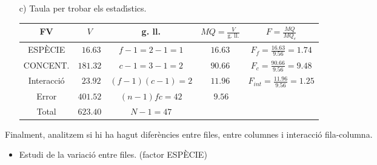 {\begin{itemize}
\begin{eqnarray*}
	\frac{{\left(\sum\limits_{r=1}^f\sum\limits_{s=1}^c\sum\limits_{i=1}^n 
	Y_{irs}\right)}^2}{nfc} = 5063.153 - 4441.74 \\ & = & 623.4065, \\
	V_e & = & \sum_{r=1}^f\sum_{s=1}^c\sum_{i=1}^n Y_{irs}^2 -
	 \frac{\sum\limits_{r=1}^f\sum\limits_{s=1}^c{\left(\sum\limits_{i=1}^n 
	Y_{irs}\right)}^2}{n} = 5065.153 - 4663.6317 \\ & = & 401.5213, \\
	V_f & = & \frac{\sum\limits_{r=1}^f {\left(\sum\limits_{s=1}^c \sum\limits_{i=1}^n 
	Y_{irs}\right)}^2}{nc} -\frac{{\left(\sum\limits_{r=1}^f\sum\limits_{s=1}^c\sum\limits_{i=1}^n 
	Y_{irs}\right)}^2}{nfc} = 4458.3844 - 4441.74 \\ & = & 16.6380,
	 \\
	V_c & = & \frac{\sum\limits_{s=1}^c {\left(\sum\limits_{r=1}^f \sum\limits_{i=1}^n 
	Y_{irs}\right)}^2}{nf}- \frac{{\left(\sum\limits_{r=1}^f\sum\limits_{s=1}^c\sum\limits_{i=1}^n 
	Y_{irs}\right)}^2}{nfc} = 4623.0674 - 4441.74 \\ & = & 181.3210,\\
	V_{int} & = & VT- V_e - V_f - V_c = 623.4065 - 401.5213 - 16.6380 - 
	181.3210 \\ & = & 23.9262.
\end{eqnarray*}
	
	\item[c)] Taula per trobar els estad\'{\i}stics.
	\begin{center}
\renewcommand{\arraystretch}{1.5}
	\begin{tabular}{|c|c|c|@{}c@{}|@{}c@{}|}
		\hline
		FV&$V$&g. ll.&$MQ=\frac{V}{\mbox{g. ll.}}$&$F=\frac{
MQ}{MQ_{e}}$\\\hline\hline
		ESP\`ECIE & $\ \,16.63$ & $f-1=2-1=1$ & $16.63$ & 
		$F_f=\frac{16.63}{9.56}=1.74$  \\
		\hline
		CONCENT. & $181.32$ & $c-1=3-1=2$ & $90.66$ & $F_c 
		=\frac{90.66}{9.56}=9.48$  \\
		\hline
		Interacci\'o & $\ \,23.92$ & $(f-1)(c-1)=2$ & $11.96$ & 
		$F_{int}=\frac{11.96}{9.56}=1.25$  \\
		\hline
		Error & $401.52$ & $(n-1)fc=42$ & $\ 9.56$ &   \\
		\hline
		Total & $623.40$ & $N - 1=47$ &  &   \\
		\hline
	\end{tabular}
\end{center}
\end{itemize}
Finalment, analitzem si hi ha hagut difer\`encies entre files, entre 
columnes i interacci\'o fila-columna.
\begin{itemize}
	\item  Estudi de la variaci\'o entre files. (factor ESP\`ECIE)
	

\end{itemize}}
